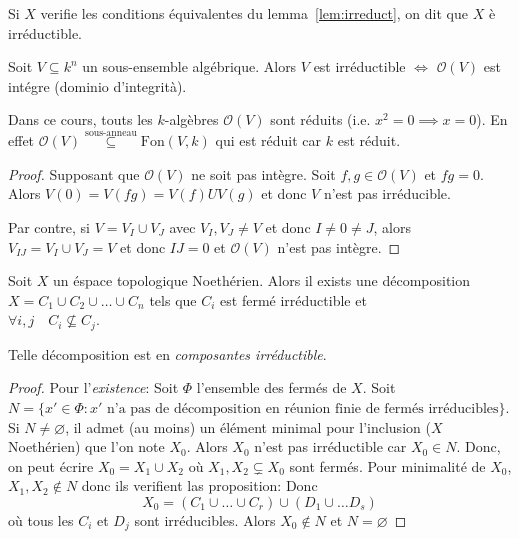\begin{definition}{}
    Si \(X\) verifie les conditions équivalentes du lemma~\ref{lem:irreduct}, on
    dit que \(X\) è irréductible.
\end{definition}

\begin{lemma}{}
    Soit \(V \subseteq k^{n} \) un sous-ensemble algébrique. Alors \(V\) est
    irréductible \(\iff\) \(\mathcal{O}{(V)}\) est intégre (dominio
    d'integrità).
\end{lemma}
\begin{remark}{}
    Dans ce cours, touts les \(k\)-algèbres \(\mathcal{O}{(V)}\) sont réduits
    (i.e. \(x^2 = 0 \implies x=0\)). En effet \(\mathcal{O}{(V)}
    \overset{\text{sous-anneau}}{\subseteq  } \mathrm{Fon}{(V, k)}\) qui est
    réduit car \(k\) est réduit.
\end{remark}

\begin{proof}{}
    Supposant que \(\mathcal{O}{(V)}\) ne soit pas intègre. Soit \(f,g \in
    \mathcal{O}{(V)}\) et \(fg = 0\). Alors \(V{(0)} = V{(fg)} = V{(f)} U
    V{(g)}\) et donc \(V\) n'est pas irréducible.

    Par contre, si \(V = V_I \cup V_J\) avec \(V_I, V_J \neq V\) et donc \(I
    \neq 0 \neq J\), alors \(V_{IJ} = V_I \cup V_J = V \) et donc \(IJ = 0 \) et
    \(\mathcal{O}{(V)}\) n'est pas intègre.
\end{proof}

\begin{proposition}{}
    Soit \(X\) un éspace topologique Noethérien. Alors il exists une
    décomposition \(X = C_{1} \cup C_{2} \cup \dots \cup C_n\) tels que \(C_i\)
    est fermé irréductible et \\\(\forall i, j \quad C_{i} \not\subseteq C_j\).

    Telle décomposition est en \emph{composantes irréductible}.
\end{proposition}

\begin{proof}{}
    Pour l'\emph{existence}: Soit \(\Phi \) l'ensemble des fermés de \(X\). Soit
    \(N = \{x' \in \Phi : x' \text{ n'a pas de décomposition en réunion finie de
    fermés irréducibles}\}\). Si \(N \neq \varnothing\), il admet (au moins) un
    élément minimal pour l'inclusion (\(X\) Noethérien) que l'on note \(X_{0}\).
    Alors \(X_{0}\) n'est pas irréductible car \(X_{0} \in N\). Donc, on peut
    écrire \(X_{0} = X_{1} \cup X_{2}\) où \(X_{1}, X_{2} \subsetneq X_{0} \)
    sont fermés. Pour minimalité de \(X_{0}\), \(X_{1}, X_{2} \not\in N\) donc
    ils verifient las proposition: Donc
    \[
      X_{0} = {(C_{1} \cup \dots \cup C_{r})} \cup {(D_{1} \cup \dots D_{s} )}
    \]
    où tous les \(C_{i}\) et \(D_{j}\) sont irréducibles. Alors \(X_{0} \not\in
    N\) et \(N = \varnothing\) 
\end{proof}

